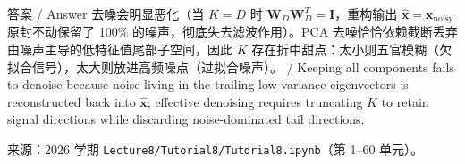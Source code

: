 \begin{StudySolution}{答案 / Answer}
去噪会明显恶化（当 $K = D$ 时 $\mathbf{W}_D \mathbf{W}_D^T = \mathbf{I}$，重构输出 $\hat{\mathbf{x}} = \mathbf{x}_{\mathrm{noisy}}$ 原封不动保留了 100\% 的噪声，彻底失去滤波作用）。PCA 去噪恰恰依赖截断丢弃由噪声主导的低特征值尾部子空间，因此 $K$ 存在折中甜点：太小则五官模糊（欠拟合信号），太大则放进高频噪点（过拟合噪声）。 / Keeping all components fails to denoise because noise living in the trailing low-variance eigenvectors is reconstructed back into $\hat{\mathbf{x}}$; effective denoising requires truncating $K$ to retain signal directions while discarding noise-dominated tail directions.
\end{StudySolution}

来源：2026 学期 \texttt{Lecture8/Tutorial8/Tutorial8.ipynb}（第 1–60 单元）。

